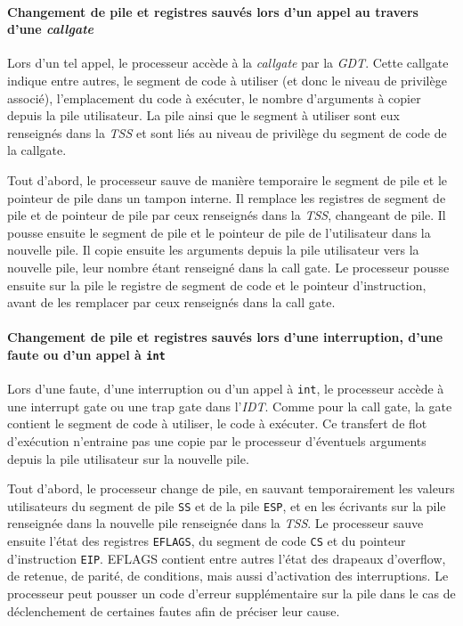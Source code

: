 \paragraph{Changement de pile et registres sauvés lors d'un appel au travers d'une \emph{callgate}}
\label{sec:intel_callgate}

Lors d'un tel appel, le processeur accède à la \emph{callgate} par la \emph{GDT}. Cette callgate indique entre autres, le segment de code à utiliser (et donc le niveau de privilège associé), l'emplacement du code à exécuter, le nombre d'arguments à copier depuis la pile utilisateur. La pile ainsi que le segment à utiliser sont eux renseignés dans la \emph{TSS} et sont liés au niveau de privilège du segment de code de la callgate.

Tout d'abord, le processeur sauve de manière temporaire le segment de pile et le pointeur de pile dans un tampon interne. Il remplace les registres de segment de pile et de pointeur de pile par ceux renseignés dans la \emph{TSS}, changeant de pile. Il pousse ensuite le segment de pile et le pointeur de pile de l'utilisateur dans la nouvelle pile. Il copie ensuite les arguments depuis la pile utilisateur vers la nouvelle pile, leur nombre étant renseigné dans la call gate. Le processeur pousse ensuite sur la pile le registre de segment de code et le pointeur d'instruction, avant de les remplacer par ceux renseignés dans la call gate.

\paragraph{Changement de pile et registres sauvés lors d'une interruption, d'une faute ou d'un appel à \texttt{int}}
\label{intel_hard_context}
Lors d'une faute, d'une interruption ou d'un appel à \texttt{int}, le processeur accède à une interrupt gate ou une trap gate dans l'\emph{IDT}. Comme pour la call gate, la gate contient le segment de code à utiliser, le code à exécuter. Ce transfert de flot d'exécution n'entraine pas une copie par le processeur d'éventuels arguments depuis la pile utilisateur sur la nouvelle pile.

Tout d'abord, le processeur change de pile, en sauvant temporairement les valeurs utilisateurs du segment de pile \texttt{SS} et de la pile \texttt{ESP}, et en les écrivants sur la pile renseignée dans la nouvelle pile renseignée dans la \emph{TSS}. Le processeur sauve ensuite l'état des registres \texttt{EFLAGS}, du segment de code \texttt{CS} et du pointeur d'instruction \texttt{EIP}. EFLAGS contient entre autres l'état des drapeaux d'overflow, de retenue, de parité, de conditions, mais aussi d'activation des interruptions. Le processeur peut pousser un code d'erreur supplémentaire sur la pile dans le cas de déclenchement de certaines fautes afin de préciser leur cause.

